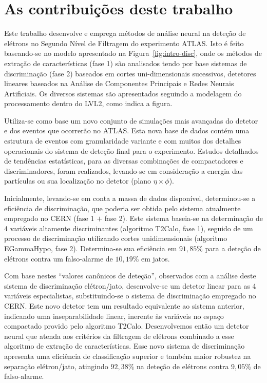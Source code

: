 \section{As contribuições deste trabalho}

Este trabalho desenvolve e emprega métodos de análise neural na deteção de
elétrons no Segundo Nível de Filtragem do experimento ATLAS. Isto é feito
baseando-se no modelo apresentado na Figura~\ref{fig:intro-disc}, onde os
métodos de extração de características (fase 1) são analisados tendo por base
sistemas de discriminação (fase 2) baseados em cortes uni-dimensionais
sucessivos, detetores lineares baseados na Análise de Componentes Principais e
Redes Neurais Artificiais. Os diversos sistemas são apresentados seguindo a
modelagem do processamento dentro do LVL2, como indica a figura.

Utiliza-se como base um novo conjunto de simulações mais avançadas do detetor
e dos eventos que ocorrerão no ATLAS. Esta nova base de dados contém uma
estrutura de eventos com granularidade variante e com muitos dos detalhes
operacionais do sistema de deteção final para o experimento. Estudos
detalhados de tendências estatísticas, para as diversas combinações de
compactadores e discriminadores, foram realizados, levando-se em consideração
a energia das partículas ou sua localização no detetor (plano
$\eta\times\phi$).

Inicialmente, levando-se em conta a massa de dados disponível, determinou-se a
eficiência de discriminação, que poderia ser obtida pelo sistema atualmente
empregado no CERN (fase 1 $+$ fase 2). Este sistema baseia-se na determinação
de 4 variáveis altamente discriminantes (algoritmo T2Calo, fase 1), seguido de
um processo de discriminação utilizando cortes unidimensionais (algoritmo
EGammaHypo, fase 2). Determina-se sua eficiência em $91,85\%$ para a deteção
de elétrons contra um falso-alarme de $10,19\%$ em jatos.

Com base nestes ``valores canônicos de deteção'', observados com a análise
deste sistema de discriminação elétron/jato, desenvolve-se um detetor linear
para as 4 variáveis especialistas, substituindo-se o sistema de discriminação
 empregado no CERN. Este novo detetor tem um resultado
equivalente ao sistema anterior, indicando uma inseparabilidade linear,
inerente às variáveis no espaço compactado provido pelo algoritmo
T2Calo. Desenvolvemos então um detetor neural que atenda aos critérios da
filtragem de elétrons combinado a esse algoritmo de extração de
características. Esse novo sistema de discriminação apresenta uma eficiência
de classificação superior e também maior robustez na separação elétron/jato,
atingindo $92,38\%$ na deteção de elétrons contra $9,05\%$ de falso-alarme.

